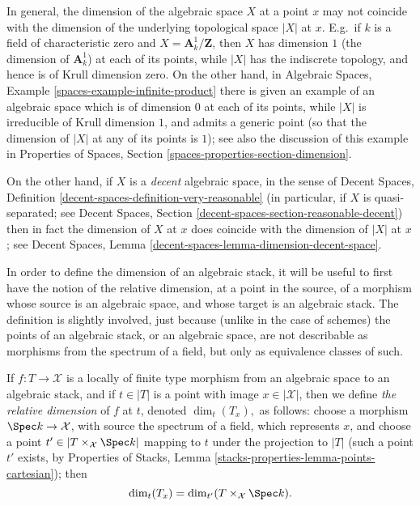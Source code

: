 \begin{remark}
\label{remark-dimension-algebraic-space}
In general, the dimension of the algebraic space $X$ at a point $x$
may not coincide with the dimension of the underlying topological space
$|X|$ at $x$.  E.g.\ if $k$ is a field of characteristic zero and
$X =  \mathbf{A}^1_k / \mathbf{Z}$, then $X$ has dimension $1$ (the dimension
of $\mathbf{A}^1_k$) at each of its points,
while $|X|$ has the indiscrete topology, and hence is of Krull
dimension zero. On the other hand, in
Algebraic Spaces, Example \ref{spaces-example-infinite-product}
there is given an example of an algebraic space
which is of dimension $0$ at each of its points, while $|X|$ is
irreducible of Krull dimension $1$, and admits a generic point (so that the
dimension of $|X|$ at any of its points is $1$); see also the discussion
of this example in
Properties of Spaces, Section \ref{spaces-properties-section-dimension}.

\medskip\noindent
On the other hand, if $X$ is a {\it decent} algebraic space, in the sense of
Decent Spaces, Definition \ref{decent-spaces-definition-very-reasonable}
(in particular, if $X$ is quasi-separated; see
Decent Spaces, Section \ref{decent-spaces-section-reasonable-decent})
then in fact the dimension of $X$ at $x$ does coincide with the dimension
of $|X|$ at $x$; see
Decent Spaces, Lemma \ref{decent-spaces-lemma-dimension-decent-space}.
\end{remark}

\noindent
In order to  define the dimension of an algebraic stack,
it will be useful to first have the notion of the relative dimension,
at a point in the source,
of a morphism whose source is an algebraic space,
and whose target is an algebraic stack.  The definition is slightly
involved, just because (unlike in the case of schemes) the points of an
algebraic stack, or an algebraic
space, are not describable as morphisms from the spectrum of a field,
but only as equivalence classes of such.

\begin{definition}
\label{definition-relative-dimension}
If $f : T \to \mathcal{X}$ is a locally of finite type morphism from an
algebraic space to an algebraic stack,
and if $t \in |T|$ is a point with image $x \in | \mathcal{X}|$, then we define
{\it the relative dimension} of $f$ at $t$, denoted
$\dim_t(T_x),$
as follows:
choose a morphism $\Spec k \to \mathcal{X}$, with source the spectrum of
a field, which represents $x$, and choose a point
$t' \in |T \times_{\mathcal{X}} \Spec k|$
mapping to $t$ under the projection to $|T|$
(such a point $t'$ exists, by
Properties of Stacks, Lemma \ref{stacks-properties-lemma-points-cartesian});
then
$$
\dim_t(T_x) = \dim_{t'}(T \times_{\mathcal{X}} \Spec k ).
$$
\end{definition}

